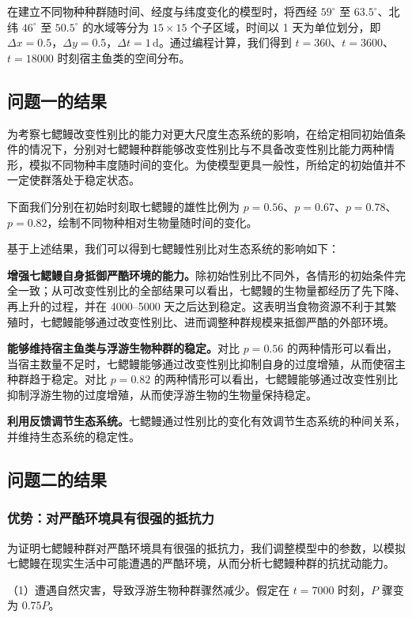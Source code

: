 \documentclass[11pt,a4paper]{ctexart}
\begin{document}
在建立不同物种种群随时间、经度与纬度变化的模型时，将西经 $59^\circ$ 至 $63.5^\circ$、北纬 $46^\circ$ 至 $50.5^\circ$ 的水域等分为 $15\times15$ 个子区域，时间以 1 天为单位划分，即 $\Delta x=0.5$，$\Delta y=0.5$，$\Delta t=1\,\mathrm{d}$。通过编程计算，我们得到 $t=360$、$t=3600$、$t=18000$ 时刻宿主鱼类的空间分布。

\subsection{问题一的结果}

为考察七鳃鳗改变性别比的能力对更大尺度生态系统的影响，在给定相同初始值条件的情况下，分别对七鳃鳗种群能够改变性别比与不具备改变性别比能力两种情形，模拟不同物种丰度随时间的变化。为使模型更具一般性，所给定的初始值并不一定使群落处于稳定状态。

下面我们分别在初始时刻取七鳃鳗的雄性比例为 $p=0.56$、$p=0.67$、$p=0.78$、$p=0.82$，绘制不同物种相对生物量随时间的变化。

基于上述结果，我们可以得到七鳃鳗性别比对生态系统的影响如下：

\textbf{增强七鳃鳗自身抵御严酷环境的能力。}除初始性别比不同外，各情形的初始条件完全一致；从可改变性别比的全部结果可以看出，七鳃鳗的生物量都经历了先下降、再上升的过程，并在 4000--5000 天之后达到稳定。这表明当食物资源不利于其繁殖时，七鳃鳗能够通过改变性别比、进而调整种群规模来抵御严酷的外部环境。

\textbf{能够维持宿主鱼类与浮游生物种群的稳定。}对比 $p=0.56$ 的两种情形可以看出，当宿主数量不足时，七鳃鳗能够通过改变性别比抑制自身的过度增殖，从而使宿主种群趋于稳定。对比 $p=0.82$ 的两种情形可以看出，七鳃鳗能够通过改变性别比抑制浮游生物的过度增殖，从而使浮游生物的生物量保持稳定。

\textbf{利用反馈调节生态系统。}七鳃鳗通过性别比的变化有效调节生态系统的种间关系，并维持生态系统的稳定性。
\subsection{问题二的结果}

\subsubsection{优势：对严酷环境具有很强的抵抗力}

为证明七鳃鳗种群对严酷环境具有很强的抵抗力，我们调整模型中的参数，以模拟七鳃鳗在现实生活中可能遭遇的严酷环境，从而分析七鳃鳗种群的抗扰动能力。

（1）遭遇自然灾害，导致浮游生物种群骤然减少。假定在 $t=7000$ 时刻，$P$ 骤变为 $0.75P$。
\end{document}
